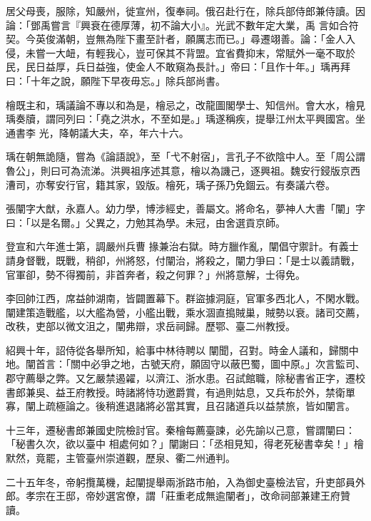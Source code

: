 \begin{pinyinscope}
 居父母喪，服除，知嚴州，徙宣州，復奉祠。俄召赴行在，除兵部侍郎兼侍讀。因論：「鄧禹嘗言『興衰在德厚薄，初不論大小』。光武不數年定大業，禹
 言如合符契。今英俊滿朝，豈無為陛下畫至計者，願厲志而已。」尋遷翊善。論：「金人入侵，未嘗一大衄，有輕我心，豈可保其不背盟。宜省費抑末，常賦外一毫不取於民，民日益厚，兵日益強，使金人不敢窺為長計。」帝曰：「且作十年。」瑀再拜曰：「十年之說，願陛下早夜毋忘。」除兵部尚書。



 檜既主和，瑀議論不專以和為是，檜忌之，改龍圖閣學士、知信州。會大水，檜見瑀奏牘，謂同列曰：「堯之洪水，不至如是。」瑀遂稱疾，提舉江州太平興國宮。坐通書李
 光，降朝議大夫，卒，年六十六。



 瑀在朝無詭隨，嘗為《論語說》，至「弋不射宿」，言孔子不欲陰中人。至「周公謂魯公」，則曰可為流涕。洪興祖序述其意，檜以為譏己，逐興祖。魏安行鋟版京西漕司，亦奪安行官，籍其家，毀版。檜死，瑀子孫乃免錮云。有奏議六卷。



 張闡字大猷，永嘉人。幼力學，博涉經史，善屬文。將命名，夢神人大書「闡」字曰：「以是名爾。」父異之，力勉其為學。未冠，由舍選貢京師。



 登宣和六年進士第，調嚴州兵曹
 掾兼治右獄。時方臘作亂，闡倡守禦計。有義士請身督戰，既戰，稍卻，州將怒，付闡治，將殺之，闡力爭曰：「是士以義請戰，官軍卻，勢不得獨前，非首奔者，殺之何罪？」州將意解，士得免。



 李回帥江西，席益帥湖南，皆闢置幕下。群盜據洞庭，官軍多西北人，不閑水戰。闡建策造戰艦，以大艦為營，小艦出戰，乘水涸直搗賊巢，賊勢以衰。諸司交薦，改秩，吏部以微文沮之，闡弗辯，求岳祠歸。歷鄂、臺二州教授。



 紹興十年，詔侍從各舉所知，給事中林待聘以
 闡聞，召對。時金人議和，歸關中地。闡首言：「關中必爭之地，古號天府，願固守以蔽巴蜀，圖中原。」次言監司、郡守薦舉之弊。又乞嚴禁遏糴，以濟江、浙水患。召試館職，除秘書省正字，遷校書郎兼吳、益王府教授。時諸將恃功邀爵賞，有過則姑息，又兵布於外，禁衛單寡，闡上疏極論之。後稍進退諸將必當其實，且召諸道兵以益禁旅，皆如闡言。



 十三年，遷秘書郎兼國史院檢討官。秦檜每薦臺諫，必先諭以己意，嘗謂闡曰：「秘書久次，欲以臺中
 相處何如？」闡謝曰：「丞相見知，得老死秘書幸矣！」檜默然，竟罷，主管臺州崇道觀，歷泉、衢二州通判。



 二十五年冬，帝躬攬萬機，起闡提舉兩浙路市舶，入為御史臺檢法官，升吏部員外郎。孝宗在王邸，帝妙選宮僚，謂「莊重老成無逾闡者」，改命祠部兼建王府贊讀。




\end{pinyinscope}
